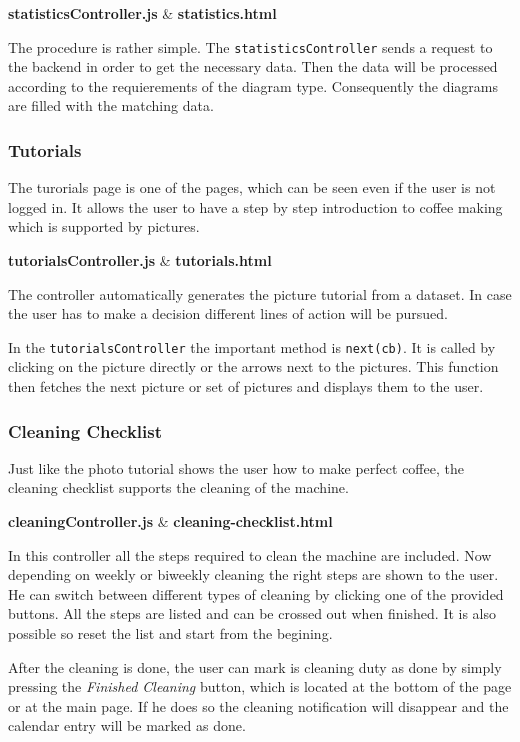 \textbf{statisticsController.js} \& \textbf{statistics.html}

The procedure is rather simple. The \texttt{statisticsController} sends
a request to the backend in order to get the necessary data. Then the
data will be processed according to the requierements of the diagram
type. Consequently the diagrams are filled with the matching data.

\subsubsection{Tutorials}\label{tutorials}

The turorials page is one of the pages, which can be seen even if the
user is not logged in. It allows the user to have a step by step
introduction to coffee making which is supported by pictures.

\textbf{tutorialsController.js} \& \textbf{tutorials.html}

The controller automatically generates the picture tutorial from a
dataset. In case the user has to make a decision different lines of
action will be pursued.

In the \texttt{tutorialsController} the important method is
\texttt{next(cb)}. It is called by clicking on the picture directly or
the arrows next to the pictures. This function then fetches the next
picture or set of pictures and displays them to the user.

\subsubsection{Cleaning Checklist}\label{cleaning-checklist}

Just like the photo tutorial shows the user how to make perfect coffee,
the cleaning checklist supports the cleaning of the machine.

\textbf{cleaningController.js} \& \textbf{cleaning-checklist.html}

In this controller all the steps required to clean the machine are
included. Now depending on weekly or biweekly cleaning the right steps
are shown to the user. He can switch between different types of cleaning
by clicking one of the provided buttons. All the steps are listed and
can be crossed out when finished. It is also possible so reset the list
and start from the begining.

After the cleaning is done, the user can mark is cleaning duty as done
by simply pressing the \emph{Finished Cleaning} button, which is located
at the bottom of the page or at the main page. If he does so the
cleaning notification will disappear and the calendar entry will be
marked as done.


